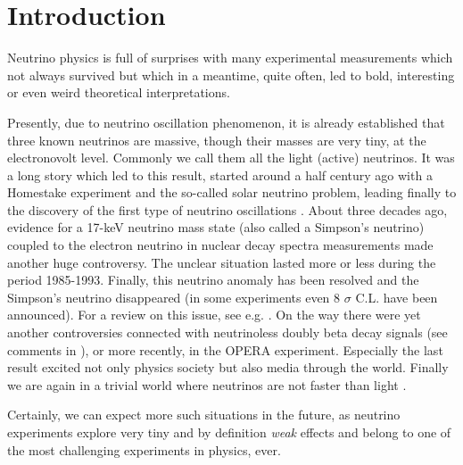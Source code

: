\documentclass[twocolumn,superscriptaddress,showpacs,prl,nofootinbib,floatfix]{revtex4}
\begin{document}



\maketitle 
\allowdisplaybreaks


\section{Introduction}

Neutrino physics is full of surprises with many  experimental measurements which not always survived but which in a meantime, quite often, led to bold, interesting or even weird theoretical interpretations. 

Presently, due to neutrino oscillation phenomenon, it is already established that three known neutrinos are massive, though their masses are very tiny, at the electronovolt level. Commonly we call them all the light (active) neutrinos. It was a long story which led to this result, started around a half century ago with a Homestake experiment and the so-called solar neutrino problem, leading finally to the discovery of the first type of neutrino oscillations \cite{Bahcall:1976zz}. About three decades ago, evidence for a 17-keV neutrino mass state (also called a Simpson's neutrino) coupled to the electron neutrino in nuclear decay spectra measurements made another huge controversy. The unclear situation lasted more or less during the period 1985-1993. Finally, this neutrino anomaly has been resolved and the Simpson's neutrino disappeared (in some experiments even 8 $\sigma$ C.L. have been announced). For a review on this issue, see e.g. \cite{Wietfeldt:1995ja,Franklin:1995pk}.  
On the way there were yet another controversies connected with neutrinoless doubly beta decay signals (see comments in \cite{Akhmedov:2014kxa}), or more recently, in the OPERA experiment.
Especially the last result excited not only physics society but also media through the world. Finally we are again in a trivial world where neutrinos are not faster than light \cite{Antonello:2012hg}. 

Certainly, we can expect more such situations in the future, as neutrino experiments explore very tiny and by definition {\it weak} effects and belong to one of the most challenging experiments in physics, ever. 
\end{document}
